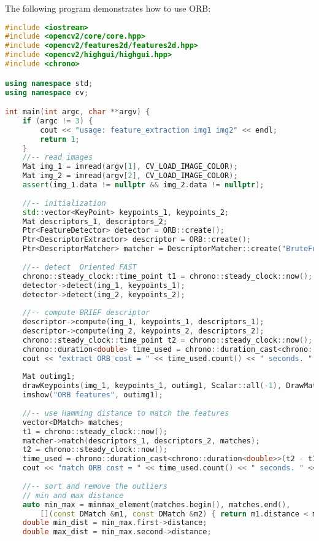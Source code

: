 The following program demonstrates how to use ORB:
\begin{lstlisting}[language=c++,caption=slambook2/ch7/orb_cv.cpp]
#include <iostream>
#include <opencv2/core/core.hpp>
#include <opencv2/features2d/features2d.hpp>
#include <opencv2/highgui/highgui.hpp>
#include <chrono>

using namespace std;
using namespace cv;

int main(int argc, char **argv) {
	if (argc != 3) {
		cout << "usage: feature_extraction img1 img2" << endl;
		return 1;
	}
	//-- read images
	Mat img_1 = imread(argv[1], CV_LOAD_IMAGE_COLOR);
	Mat img_2 = imread(argv[2], CV_LOAD_IMAGE_COLOR);
	assert(img_1.data != nullptr && img_2.data != nullptr);
	
	//-- initialization
	std::vector<KeyPoint> keypoints_1, keypoints_2;
	Mat descriptors_1, descriptors_2;
	Ptr<FeatureDetector> detector = ORB::create();
	Ptr<DescriptorExtractor> descriptor = ORB::create();
	Ptr<DescriptorMatcher> matcher = DescriptorMatcher::create("BruteForce-Hamming");
	
	//-- detect  Oriented FAST
	chrono::steady_clock::time_point t1 = chrono::steady_clock::now();
	detector->detect(img_1, keypoints_1);
	detector->detect(img_2, keypoints_2);
	
	//-- compute BRIEF descriptor
	descriptor->compute(img_1, keypoints_1, descriptors_1);
	descriptor->compute(img_2, keypoints_2, descriptors_2);
	chrono::steady_clock::time_point t2 = chrono::steady_clock::now();
	chrono::duration<double> time_used = chrono::duration_cast<chrono::duration<double>>(t2 - t1);
	cout << "extract ORB cost = " << time_used.count() << " seconds. " << endl;
	
	Mat outimg1;
	drawKeypoints(img_1, keypoints_1, outimg1, Scalar::all(-1), DrawMatchesFlags::DEFAULT);
	imshow("ORB features", outimg1);
	
	//-- use Hamming distance to match the features
	vector<DMatch> matches;
	t1 = chrono::steady_clock::now();
	matcher->match(descriptors_1, descriptors_2, matches);
	t2 = chrono::steady_clock::now();
	time_used = chrono::duration_cast<chrono::duration<double>>(t2 - t1);
	cout << "match ORB cost = " << time_used.count() << " seconds. " << endl;
	
	//-- sort and remove the outliers
	// min and max distance
	auto min_max = minmax_element(matches.begin(), matches.end(),
		[](const DMatch &m1, const DMatch &m2) { return m1.distance < m2.distance; });
	double min_dist = min_max.first->distance;
	double max_dist = min_max.second->distance;
	

\end{lstlisting}
